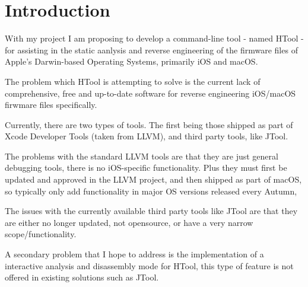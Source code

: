\section{Introduction}

With my project I am proposing to develop a command-line tool - named HTool - for assisting in the static aanlysis and reverse engineering of the firmware files of Apple's Darwin-based Operating Systems, primarily iOS and macOS.

The problem which HTool is attempting to solve is the current lack of comprehensive, free and up-to-date software for reverse engineering iOS/macOS firwmare files specifically. 

Currently, there are two types of tools. The first being those shipped as part of Xcode Developer Tools (taken from LLVM), and third party tools, like JTool. 

The problems with the standard LLVM tools are that they are just general debugging tools, there is no iOS-specific functionality. Plus they must first be updated and approved in the LLVM project, and then shipped as part of macOS, so typically only add functionality in major OS versions released every Autumn,

The issues with the currently available third party tools like JTool are that they are either no longer updated, not opensource, or have a very narrow scope/functionality. 

A secondary problem that I hope to address is the implementation of a interactive analysis and disassembly mode for HTool, this type of feature is not offered in existing solutions such as JTool.
